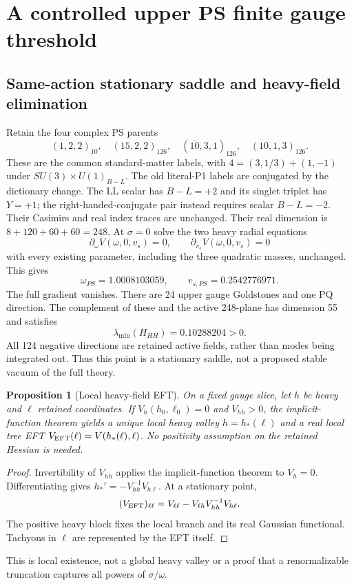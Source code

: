 \documentclass[11pt]{article}
\newtheorem{proposition}{Proposition}
\begin{document}
\section{A controlled upper PS finite gauge threshold}
\subsection{Same-action stationary saddle and heavy-field elimination}
Retain the four complex PS parents
\begin{equation}
 (1,2,2)_{10},\quad(15,2,2)_{126},\quad
 (\overline{10},3,1)_{126},\quad(10,1,3)_{126}.
\end{equation}
These are the common standard-matter labels, with
$4=(3,1/3)+(1,-1)$ under $SU(3)\times U(1)_{B-L}$.
The old literal-P1 labels are conjugated by the dictionary change.
The LL scalar has $B-L=+2$ and its singlet triplet has $Y=+1$;
the right-handed-conjugate pair instead requires scalar $B-L=-2$.
Their Casimirs and real index traces are unchanged.
Their real dimension is $8+120+60+60=248$.
At $\sigma=0$ solve the two heavy radial equations
\begin{equation}
 \partial_\omega V(\omega,0,v_s)=0,\qquad
 \partial_{v_s}V(\omega,0,v_s)=0
\end{equation}
with every existing parameter, including the three quadratic masses,
unchanged. This gives
\begin{equation}
 \omega_{PS}=1.0008103059,\qquad v_{s,PS}=0.2542776971.
\end{equation}
The full gradient vanishes. There are 24 upper gauge Goldstones and one PQ
direction. The complement of these and the active 248-plane has dimension
55 and satisfies
\begin{equation}
\lambda_{\min}(H_{HH})=0.10288204>0.
\end{equation}
All 124 negative directions are retained active fields, rather than modes
being integrated out. Thus this point is a stationary saddle, not a proposed
stable vacuum of the full theory.

\begin{proposition}[Local heavy-field EFT]
On a fixed gauge slice, let $h$ be heavy and $\ell$ retained coordinates.
If $V_h(h_0,\ell_0)=0$ and $V_{hh}>0$, the implicit-function theorem yields
a unique local heavy valley $h=h_*(\ell)$ and a real local tree EFT
$V_{\rm EFT}(\ell)=V(h_*(\ell),\ell)$. No positivity assumption on the
retained Hessian is needed.
\end{proposition}
\begin{proof}
Invertibility of $V_{hh}$ applies the implicit-function theorem to $V_h=0$.
Differentiating gives $h_*'=-V_{hh}^{-1}V_{h\ell}$. At a stationary point,
\begin{equation}
 (V_{\rm EFT})_{\ell\ell}
 =V_{\ell\ell}-V_{\ell h}V_{hh}^{-1}V_{h\ell}.
\label{eq:schurEFT}
\end{equation}
The positive heavy block fixes the local branch and its real Gaussian
functional. Tachyons in $\ell$ are represented by the EFT itself.
\end{proof}
This is local existence, not a global heavy valley or a proof that a
renormalizable truncation captures all powers of $\sigma/\omega$.
\end{document}
